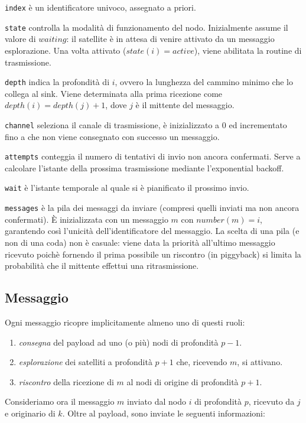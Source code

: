 \documentclass[a4paper,12pt]{article}
\theoremstyle{definition}
\begin{document}
\texttt{index} è un identificatore univoco, assegnato a priori.

\texttt{state} controlla la modalità di funzionamento del nodo. Inizialmente assume il valore di $waiting$: il satellite è in attesa di venire attivato da un messaggio esplorazione. Una volta attivato ($state(i) = active$), viene abilitata la routine di trasmissione.

\texttt{depth} indica la profondità di $i$, ovvero la lunghezza del cammino minimo che lo collega al sink. Viene determinata alla prima ricezione come $depth(i) = depth(j) + 1$, dove $j$ è il mittente del messaggio.

\texttt{channel} seleziona il canale di trasmissione, è inizializzato a $0$ ed incrementato fino a che non viene consegnato con successo un messaggio.

\texttt{attempts} conteggia il numero di tentativi di invio non ancora confermati. Serve a calcolare l'istante della prossima trasmissione mediante l'exponential backoff.

\texttt{wait} è l'istante temporale al quale si è pianificato il prossimo invio.

\texttt{messages} è la pila dei messaggi da inviare (compresi quelli inviati ma non ancora confermati). È inizializzata con un messaggio $m$ con $number(m) = i$, garantendo così l'unicità dell'identificatore del messaggio. La scelta di una pila (e non di una coda) non è casuale: viene data la priorità all'ultimo messaggio ricevuto poichè fornendo il prima possibile un riscontro (in piggyback) si limita la probabilità che il mittente effettui una ritrasmissione.

\subsection{Messaggio}

Ogni messaggio ricopre implicitamente almeno uno di questi ruoli:

\begin{enumerate}
\item \emph{consegna} del payload ad uno (o più) nodi di profondità $p-1$.
\item \emph{esplorazione} dei satelliti a profondità $p+1$ che, ricevendo $m$, si attivano.
\item \emph{riscontro} della ricezione di $m$ al nodi di origine di profondità $p+1$.
\end{enumerate}

Consideriamo ora il messaggio $m$ inviato dal nodo $i$ di profondità $p$, ricevuto da $j$ e originario di $k$. Oltre al payload, sono inviate le seguenti informazioni:
\end{document}
